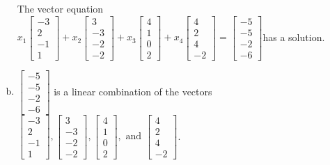 \begin{exerciseAnswer}
\begin{enumerate}[(a)]
\begin{center}
\begin{minipage}{0.8\textwidth}
 The vector equation \( x_{1} \left[\begin{array}{c}
-3 \\
2 \\
-1 \\
1
\end{array}\right] + x_{2} \left[\begin{array}{c}
3 \\
-3 \\
-2 \\
-2
\end{array}\right] + x_{3} \left[\begin{array}{c}
4 \\
1 \\
0 \\
2
\end{array}\right] + x_{4} \left[\begin{array}{c}
4 \\
2 \\
4 \\
-2
\end{array}\right] = \left[\begin{array}{c}
-5 \\
-5 \\
-2 \\
-6
\end{array}\right] \)has a solution.
\end{minipage}\end{center}
    
\item 

\( \left[\begin{array}{c}
-5 \\
-5 \\
-2 \\
-6
\end{array}\right] \) is a linear combination of the vectors \( \left[\begin{array}{c}
-3 \\
2 \\
-1 \\
1
\end{array}\right] , \left[\begin{array}{c}
3 \\
-3 \\
-2 \\
-2
\end{array}\right] , \left[\begin{array}{c}
4 \\
1 \\
0 \\
2
\end{array}\right] , \text{ and } \left[\begin{array}{c}
4 \\
2 \\
4 \\
-2
\end{array}\right] \). 


\end{enumerate}
    
\end{exerciseAnswer}
    
